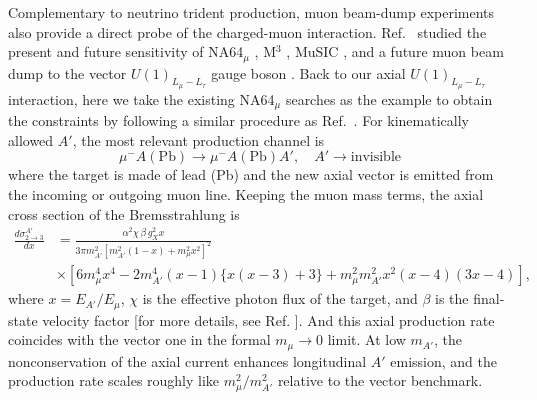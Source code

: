 \documentclass[onecolumn, aps, nofootinbib, prd, preprint, floats, floatfix, amsmath, amssymb, superscriptaddress, preprintnumbers]{revtex4-2}
\begin{document}
Complementary to neutrino trident production, muon beam-dump experiments also provide a direct probe of the charged-muon interaction. Ref.~\cite{Chakraborty:2025jbd} studied the present and future sensitivity of NA64$_\mu$ \cite{NA64:2024nwj}, M$^3$ \cite{Kahn:2018cqs}, MuSIC \cite{Acosta:2021qpx,Acosta:2022ejc}, and a future muon beam dump to the vector $U(1)_{L_\mu-L_\tau}$ gauge boson \cite{Cesarotti:2022ttv}. Back to our axial $U(1)_{L_\mu-L_\tau}$ interaction, here we take the existing NA64$_\mu$ searches as the example to obtain the constraints by following a similar procedure as Ref.~\cite{Chakraborty:2025jbd}.
For kinematically allowed $A'$, the most relevant production channel is
\begin{equation}
\mu^- A(\text{Pb}) \to \mu^- A(\text{Pb}) A', \quad A' \to \text{invisible}
\label{eq:NA64production}
\end{equation}
where the target is made of lead (Pb) \cite{andreev2024exploration} and the new axial vector is emitted from the incoming or outgoing muon line. 
Keeping the muon mass terms, the axial cross section of the Bremsstrahlung is \cite{Chakraborty:2025jbd}
\begin{equation}
\begin{aligned}
\frac{d\sigma^{A'}_{2\to 3}}{dx}
&=\frac{\alpha^2\chi\,\beta\,g_X^2 x}{3\pi m_{A'}^2\left[m_{A'}^2(1-x)+m_\mu^2x^2\right]^2} \\
&\times\left[ 6m_\mu^4x^4 -2m_{A'}^4(x-1)\{x(x-3)+3\} +m_\mu^2m_{A'}^2x^2(x-4)(3x-4) \right],
\label{eq:beamdump-axial-spectrum}
\end{aligned}
\end{equation}
where $x=E_{A'}/E_\mu$, $\chi$ is the effective photon flux of the target, and $\beta$ is the final-state velocity factor [for more details, see Ref. \cite{Chakraborty:2025jbd}].
And this axial production rate coincides with the vector one in the formal $m_\mu\to0$ limit. At low $m_{A'}$, the nonconservation of the axial current enhances longitudinal $A'$ emission, and the production rate scales roughly like $m_\mu^2/m_{A'}^2$ relative to the vector benchmark.
\end{document}
